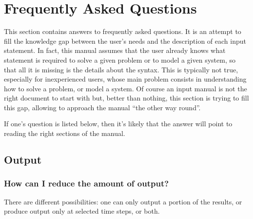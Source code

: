 %
%
%
%
%
% 
%
%

\chapter{Frequently Asked Questions}\label{sec:FAQ}
This section contains answers to frequently asked questions.
It is an attempt to fill the knowledge gap between the user's needs
and the description of each input statement.
In fact, this manual assumes that the user already knows what statement
is required to solve a given problem or to model a given system, so that
all it is missing is the details about the syntax.
This is typically not true, especially for inexperienced users, whose
main problem consists in understanding how to solve a problem,
or model a system.
Of course an input manual is not the right document to start with but,
better than nothing, this section is trying to fill this gap,
allowing to approach the manual ``the other way round''.

If one's question is listed below, then it's likely that the answer 
will point to reading the right sections of the manual.

\section{Output}
\subsection{How can I reduce the amount of output?}
There are different possibilities: one can only output a portion
of the results, or produce output only at selected time steps, or both.

